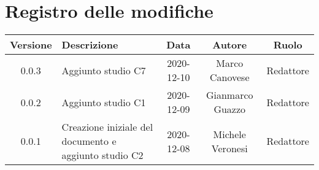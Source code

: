 \section*{Registro delle modifiche}

\begin{center}
	\begin{longtable}{|c|p{5cm}|c|c|c|}
	\hline
	\rowcolor{lighter-grayer}
	\textbf{Versione} & \textbf{Descrizione} & \textbf{Data} & \textbf{Autore} & \textbf{Ruolo} \\
	\hline
	\endfirsthead


	\hline
	0.0.3 & Aggiunto studio C7 & 2020-12-10 & Marco Canovese & Redattore \\
	0.0.2 & Aggiunto studio C1 & 2020-12-09 & Gianmarco Guazzo & Redattore\\
    0.0.1 & Creazione iniziale del documento e aggiunto studio C2 & 2020-12-08 & Michele Veronesi & Redattore\\
	\hline

	\end{longtable}
\end{center}